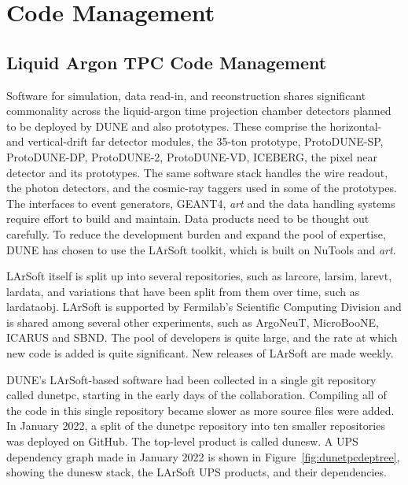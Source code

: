 \documentclass[../main-v1.tex]{subfiles}
\begin{document}
\chapter{Code Management }
\label{ch:codemgmt}

\section{Liquid Argon TPC Code Management }
\label{sec:codemgmt:dunetpc}  %

Software for simulation, data read-in, and reconstruction shares significant commonality across the liquid-argon time projection chamber detectors planned to be deployed by DUNE and also prototypes.  These comprise the horizontal- and vertical-drift far detector modules, the 35-ton prototype, ProtoDUNE-SP, ProtoDUNE-DP, ProtoDUNE-2, ProtoDUNE-VD, ICEBERG, the pixel near detector and its prototypes.  The same software stack handles the wire readout, the photon detectors, and the cosmic-ray taggers used in some of the prototypes.  The interfaces to event generators, GEANT4, {\it art} and the data handling systems require effort to build and maintain.  Data products need to be thought out carefully.  To reduce the development burden and expand the pool of expertise, DUNE has chosen to use the LArSoft toolkit, which is built on NuTools and {\it art}.  

LArSoft itself is split up into several repositories, such as larcore, larsim, larevt, lardata, and variations that have been split from them over time, such as lardataobj.  LArSoft is supported by Fermilab's Scientific Computing Division and is shared among several other experiments, such as ArgoNeuT, MicroBooNE, ICARUS and SBND.  The pool of developers is quite large, and the rate at which new code is added is quite significant.  New releases of LArSoft are made weekly.  

DUNE's LArSoft-based software had been collected in a single git repository called dunetpc, starting in the early days of the collaboration.  Compiling all of the code in this single repository became slower as more source files were added.  In January 2022, a split of the dunetpc repository into ten smaller repositories was deployed on GitHub.  The top-level product is called dunesw.  A UPS dependency graph made in January 2022 is shown in Figure~\ref{fig:dunetpcdeptree}, showing the dunesw stack, the LArSoft UPS products, and their dependencies.
\end{document}
